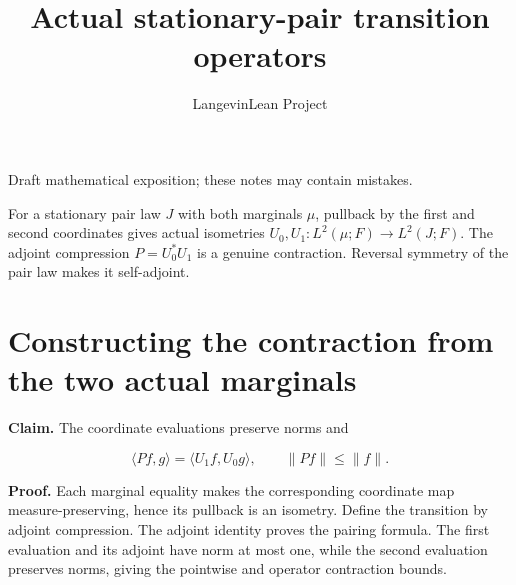 \documentclass[11pt,a4paper]{article}
\title{\texorpdfstring{Actual stationary-pair transition operators}{Actual stationary-pair transition operators}}
\author{LangevinLean Project}
\date{}
\begin{document}
\maketitle
Draft mathematical exposition; these notes may contain mistakes.


For a stationary pair law \(J\) with both marginals \(\mu\), pullback by the first and second coordinates gives actual isometries \(U_0,U_1:L^2(\mu;F)\to L^2(J;F)\). The adjoint compression \(P=U_0^*U_1\) is a genuine contraction. Reversal symmetry of the pair law makes it self-adjoint.


\section{\texorpdfstring{Constructing the contraction from the two actual marginals}{Constructing the contraction from the two actual marginals}}


\textbf{Claim.} The coordinate evaluations preserve norms and

\[\langle Pf,g\rangle=\langle U_1f,U_0g\rangle,\qquad\|Pf\|\le\|f\|.\]

\textbf{Proof.} Each marginal equality makes the corresponding coordinate map measure-preserving, hence its pullback is an isometry. Define the transition by adjoint compression. The adjoint identity proves the pairing formula. The first evaluation and its adjoint have norm at most one, while the second evaluation preserves norms, giving the pointwise and operator contraction bounds.
\end{document}
